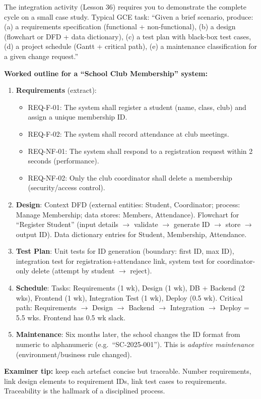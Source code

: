 \documentclass[11pt]{article}
\begin{document}
\begin{experience}
The integration activity (Lesson 36) requires you to demonstrate the complete cycle on a small case study. Typical GCE task: ``Given a brief scenario, produce: (a) a requirements specification (functional + non-functional), (b) a design (flowchart or DFD + data dictionary), (c) a test plan with black-box test cases, (d) a project schedule (Gantt + critical path), (e) a maintenance classification for a given change request.''

\textbf{Worked outline for a ``School Club Membership'' system:}
\begin{enumerate}
\item \textbf{Requirements} (extract):
\begin{itemize}
\item REQ-F-01: The system shall register a student (name, class, club) and assign a unique membership ID.
\item REQ-F-02: The system shall record attendance at club meetings.
\item REQ-NF-01: The system shall respond to a registration request within 2 seconds (performance).
\item REQ-NF-02: Only the club coordinator shall delete a membership (security/access control).
\end{itemize}
\item \textbf{Design}: Context DFD (external entities: Student, Coordinator; process: Manage Membership; data stores: Members, Attendance). Flowchart for ``Register Student'' (input details $\rightarrow$ validate $\rightarrow$ generate ID $\rightarrow$ store $\rightarrow$ output ID). Data dictionary entries for Student, Membership, Attendance.
\item \textbf{Test Plan}: Unit tests for ID generation (boundary: first ID, max ID), integration test for registration+attendance link, system test for coordinator-only delete (attempt by student $\rightarrow$ reject).
\item \textbf{Schedule}: Tasks: Requirements (1 wk), Design (1 wk), DB + Backend (2 wks), Frontend (1 wk), Integration Test (1 wk), Deploy (0.5 wk). Critical path: Requirements $\rightarrow$ Design $\rightarrow$ Backend $\rightarrow$ Integration $\rightarrow$ Deploy = 5.5 wks. Frontend has 0.5 wk slack.
\item \textbf{Maintenance}: Six months later, the school changes the ID format from numeric to alphanumeric (e.g.\ ``SC-2025-001''). This is \emph{adaptive maintenance} (environment/business rule changed).
\end{enumerate}
\textbf{Examiner tip:} keep each artefact concise but traceable. Number requirements, link design elements to requirement IDs, link test cases to requirements. Traceability is the hallmark of a disciplined process.
\end{experience}
\end{document}
